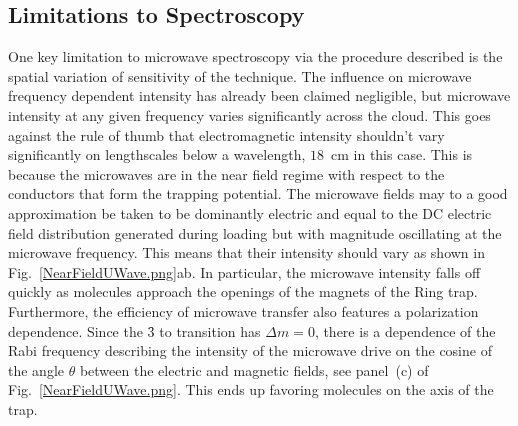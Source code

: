 \documentclass[defaultstyle,11pt]{thesis}
\begin{document}

\subsection{Limitations to Spectroscopy}\label{limitationsection}

One key limitation to microwave spectroscopy via the procedure described is the spatial variation of sensitivity of the technique.
The influence on microwave frequency dependent intensity has already been claimed negligible, but microwave intensity at any given frequency varies significantly across the cloud.
This goes against the rule of thumb that electromagnetic intensity shouldn't vary significantly on lengthscales below a wavelength, $18$~cm in this case.
This is because the microwaves are in the near field regime with respect to the conductors that form the trapping potential.
The microwave fields may to a good approximation be taken to be dominantly electric and equal to the DC electric field distribution generated during loading but with magnitude oscillating at the microwave frequency.
This means that their intensity should vary as shown in Fig.~\ref{NearFieldUWave.png}ab.
In particular, the microwave intensity falls off quickly as molecules approach the openings of the magnets of the Ring trap.
Furthermore, the efficiency of microwave transfer also features a polarization dependence.
Since the \f3 to  transition has $\Delta m=0$, there is a dependence of the Rabi frequency describing the intensity of the microwave drive on the cosine of the angle $\theta$ between the electric and magnetic fields, see panel~(c) of Fig.~\ref{NearFieldUWave.png}.
This ends up favoring molecules on the axis of the trap.

\end{document}
